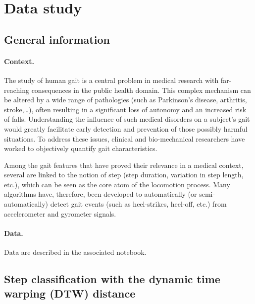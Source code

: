 \documentclass[11pt]{article}
\begin{document}

\section{Data study}

\subsection{General information}

\paragraph{Context.}
The study of human gait is a central problem in medical research with far-reaching consequences in the public health domain. This complex mechanism can be altered by a wide range of pathologies (such as Parkinson's disease, arthritis, stroke,\ldots), often resulting in a significant loss of autonomy and an increased risk of falls. Understanding the influence of such medical disorders on a subject's gait would greatly facilitate early detection and prevention of those possibly harmful situations. To address these issues, clinical and bio-mechanical researchers have worked to objectively quantify gait characteristics.

Among the gait features that have proved their relevance in a medical context, several are linked to the notion of step (step duration, variation in step length, etc.), which can be seen as the core atom of the locomotion process. Many algorithms have, therefore, been developed to automatically (or semi-automatically) detect gait events (such as heel-strikes, heel-off, etc.) from accelerometer and gyrometer signals.

\paragraph{Data.}
Data are described in the associated notebook.

\subsection{Step classification with the dynamic time warping (DTW) distance}
\end{document}
